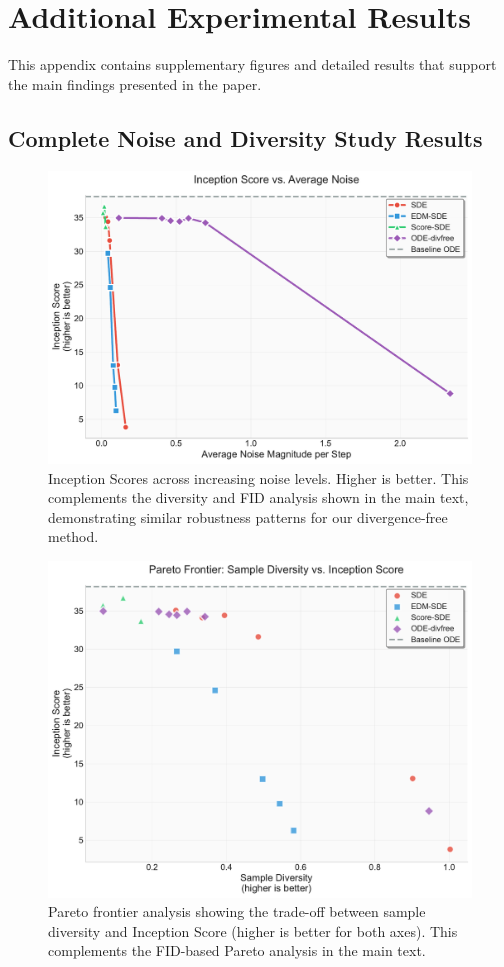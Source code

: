 \documentclass{article}
\begin{document}
\section{Additional Experimental Results}

This appendix contains supplementary figures and detailed results that support the main findings presented in the paper.

\subsection{Complete Noise and Diversity Study Results}

\begin{figure}[H]
  \centering
  \includegraphics[width=0.7\linewidth]{figures/noise_study_is.pdf}
  \caption{Inception Scores across increasing noise levels. Higher is better. This complements the diversity and FID analysis shown in the main text, demonstrating similar robustness patterns for our divergence-free method.}
  \label{fig:is-noise}
\end{figure}

\begin{figure}[H]
  \centering
  \includegraphics[width=0.7\linewidth]{figures/pareto_diversity_vs_inception.pdf}
  \caption{Pareto frontier analysis showing the trade-off between sample diversity and Inception Score (higher is better for both axes). This complements the FID-based Pareto analysis in the main text.}
  \label{fig:pareto-inception}
\end{figure}
\end{document}
